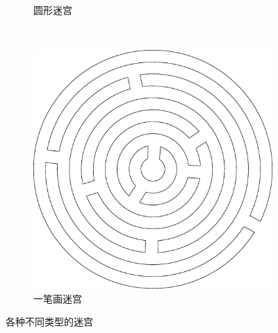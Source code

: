 \documentclass[cs4size,a4paper,adobefonts]{ctexart}
\begin{document}
\begin{figure}[htbp]
\begin{subfigure}[c]{0.31\textwidth}
    \caption{圆形迷宫}
  \end{subfigure}
  ~
  \begin{subfigure}[c]{0.31\textwidth}
    \centering
    \includegraphics[width=\textwidth]{eulerMaze}
    \caption{一笔画迷宫}
  \end{subfigure}
  \caption{各种不同类型的迷宫}\label{fig:manyMazes}
\end{figure}



\end{document}
